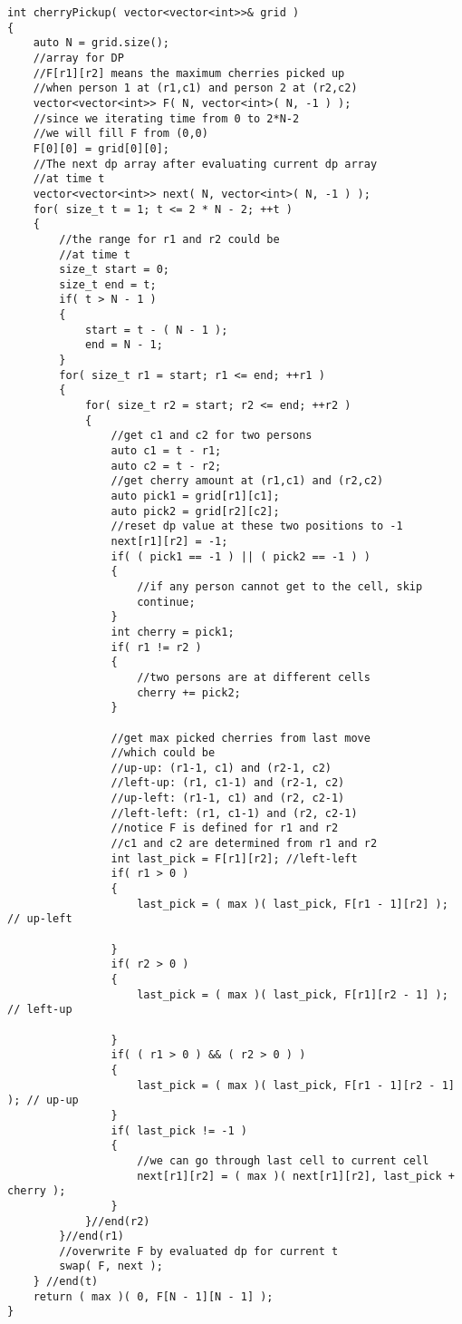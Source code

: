 \begin{lstlisting}[style=customc, caption={DP Bottom Up}]
int cherryPickup( vector<vector<int>>& grid )
{
    auto N = grid.size();
    //array for DP
    //F[r1][r2] means the maximum cherries picked up
    //when person 1 at (r1,c1) and person 2 at (r2,c2)
    vector<vector<int>> F( N, vector<int>( N, -1 ) );
    //since we iterating time from 0 to 2*N-2
    //we will fill F from (0,0)
    F[0][0] = grid[0][0];
    //The next dp array after evaluating current dp array
    //at time t
    vector<vector<int>> next( N, vector<int>( N, -1 ) );
    for( size_t t = 1; t <= 2 * N - 2; ++t )
    {
        //the range for r1 and r2 could be
        //at time t
        size_t start = 0;
        size_t end = t;
        if( t > N - 1 )
        {
            start = t - ( N - 1 );
            end = N - 1;
        }
        for( size_t r1 = start; r1 <= end; ++r1 )
        {
            for( size_t r2 = start; r2 <= end; ++r2 )
            {
                //get c1 and c2 for two persons
                auto c1 = t - r1;
                auto c2 = t - r2;
                //get cherry amount at (r1,c1) and (r2,c2)
                auto pick1 = grid[r1][c1];
                auto pick2 = grid[r2][c2];
                //reset dp value at these two positions to -1
                next[r1][r2] = -1;
                if( ( pick1 == -1 ) || ( pick2 == -1 ) )
                {
                    //if any person cannot get to the cell, skip
                    continue;
                }
                int cherry = pick1;
                if( r1 != r2 )
                {
                    //two persons are at different cells
                    cherry += pick2;
                }

                //get max picked cherries from last move
                //which could be
                //up-up: (r1-1, c1) and (r2-1, c2)
                //left-up: (r1, c1-1) and (r2-1, c2)
                //up-left: (r1-1, c1) and (r2, c2-1)
                //left-left: (r1, c1-1) and (r2, c2-1)
                //notice F is defined for r1 and r2
                //c1 and c2 are determined from r1 and r2
                int last_pick = F[r1][r2]; //left-left
                if( r1 > 0 )
                {
                    last_pick = ( max )( last_pick, F[r1 - 1][r2] ); // up-left

                }
                if( r2 > 0 )
                {
                    last_pick = ( max )( last_pick, F[r1][r2 - 1] ); // left-up

                }
                if( ( r1 > 0 ) && ( r2 > 0 ) )
                {
                    last_pick = ( max )( last_pick, F[r1 - 1][r2 - 1] ); // up-up
                }
                if( last_pick != -1 )
                {
                    //we can go through last cell to current cell
                    next[r1][r2] = ( max )( next[r1][r2], last_pick + cherry );
                }
            }//end(r2)
        }//end(r1)
        //overwrite F by evaluated dp for current t
        swap( F, next );
    } //end(t)
    return ( max )( 0, F[N - 1][N - 1] );
}
\end{lstlisting}


